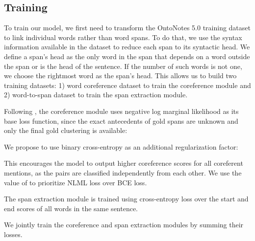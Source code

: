 \documentclass[11pt]{article}
\begin{document}
\subsection{Training}
To train our model, we first need to transform the OntoNotes 5.0 training dataset to link individual words rather than word spans. To do that, we use the syntax information available in the dataset to reduce each span to its syntactic head. We define a span's head as the only word in the span that depends on a word outside the span or is the head of the sentence. If the number of such words is not one, we choose the rightmost word as the span's head. This allows us to build two training datasets: 1) word coreference dataset to train the coreference module and 2) word-to-span dataset to train the span extraction module.

Following \citet{lee-etal-2017-end}, the coreference module uses negative log marginal likelihood as its base loss function, since the exact antecedents of gold spans are unknown and only the final gold clustering is available:

We propose to use binary cross-entropy as an additional regularization factor:

This encourages the model to output higher coreference scores for all coreferent mentions, as the pairs are classified independently from each other. We use the value of  to prioritize NLML loss over BCE loss.

The span extraction module is trained using cross-entropy loss over the start and end scores of all words in the same sentence.

We jointly train the coreference and span extraction modules by summing their losses.
\end{document}

